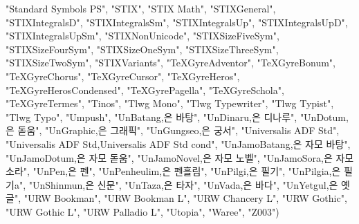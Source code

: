 \documentclass[
]{article}
\newenvironment{Shaded}{\begin{snugshade}}{\end{snugshade}}
\newcommand{\NormalTok}[1]{#1}
\newcommand{\StringTok}[1]{\textcolor[rgb]{0.31,0.60,0.02}{#1}}
\begin{document}
\begin{Shaded}
\begin{Highlighting}[]
  \StringTok{"Standard Symbols PS"}\NormalTok{,}
  \StringTok{"STIX"}\NormalTok{,}
  \StringTok{"STIX Math"}\NormalTok{,}
  \StringTok{"STIXGeneral"}\NormalTok{,}
  \StringTok{"STIXIntegralsD"}\NormalTok{,}
  \StringTok{"STIXIntegralsSm"}\NormalTok{,}
  \StringTok{"STIXIntegralsUp"}\NormalTok{,}
  \StringTok{"STIXIntegralsUpD"}\NormalTok{,}
  \StringTok{"STIXIntegralsUpSm"}\NormalTok{,}
  \StringTok{"STIXNonUnicode"}\NormalTok{,}
  \StringTok{"STIXSizeFiveSym"}\NormalTok{,}
  \StringTok{"STIXSizeFourSym"}\NormalTok{,}
  \StringTok{"STIXSizeOneSym"}\NormalTok{,}
  \StringTok{"STIXSizeThreeSym"}\NormalTok{,}
  \StringTok{"STIXSizeTwoSym"}\NormalTok{,}
  \StringTok{"STIXVariants"}\NormalTok{,}
  \StringTok{"TeXGyreAdventor"}\NormalTok{,}
  \StringTok{"TeXGyreBonum"}\NormalTok{,}
  \StringTok{"TeXGyreChorus"}\NormalTok{,}
  \StringTok{"TeXGyreCursor"}\NormalTok{,}
  \StringTok{"TeXGyreHeros"}\NormalTok{,}
  \StringTok{"TeXGyreHerosCondensed"}\NormalTok{,}
  \StringTok{"TeXGyrePagella"}\NormalTok{,}
  \StringTok{"TeXGyreSchola"}\NormalTok{,}
  \StringTok{"TeXGyreTermes"}\NormalTok{,}
  \StringTok{"Tinos"}\NormalTok{,}
  \StringTok{"Tlwg Mono"}\NormalTok{,}
  \StringTok{"Tlwg Typewriter"}\NormalTok{,}
  \StringTok{"Tlwg Typist"}\NormalTok{,}
  \StringTok{"Tlwg Typo"}\NormalTok{,}
  \StringTok{"Umpush"}\NormalTok{,}
  \StringTok{"UnBatang,은 바탕"}\NormalTok{,}
  \StringTok{"UnDinaru,은 디나루"}\NormalTok{,}
  \StringTok{"UnDotum,은 돋움"}\NormalTok{,}
  \StringTok{"UnGraphic,은 그래픽"}\NormalTok{,}
  \StringTok{"UnGungseo,은 궁서"}\NormalTok{,}
  \StringTok{"Universalis ADF Std"}\NormalTok{,}
  \StringTok{"Universalis ADF Std,Universalis ADF Std cond"}\NormalTok{,}
  \StringTok{"UnJamoBatang,은 자모 바탕"}\NormalTok{,}
  \StringTok{"UnJamoDotum,은 자모 돋움"}\NormalTok{,}
  \StringTok{"UnJamoNovel,은 자모 노벨"}\NormalTok{,}
  \StringTok{"UnJamoSora,은 자모 소라"}\NormalTok{,}
  \StringTok{"UnPen,은 펜"}\NormalTok{,}
  \StringTok{"UnPenheulim,은 펜흘림"}\NormalTok{,}
  \StringTok{"UnPilgi,은 필기"}\NormalTok{,}
  \StringTok{"UnPilgia,은 필기a"}\NormalTok{,}
  \StringTok{"UnShinmun,은 신문"}\NormalTok{,}
  \StringTok{"UnTaza,은 타자"}\NormalTok{,}
  \StringTok{"UnVada,은 바다"}\NormalTok{,}
  \StringTok{"UnYetgul,은 옛글"}\NormalTok{,}
  \StringTok{"URW Bookman"}\NormalTok{,}
  \StringTok{"URW Bookman L"}\NormalTok{,}
  \StringTok{"URW Chancery L"}\NormalTok{,}
  \StringTok{"URW Gothic"}\NormalTok{,}
  \StringTok{"URW Gothic L"}\NormalTok{,}
  \StringTok{"URW Palladio L"}\NormalTok{,}
  \StringTok{"Utopia"}\NormalTok{,}
  \StringTok{"Waree"}\NormalTok{,}
  \StringTok{"Z003"}\NormalTok{)}
 
\end{Highlighting}
\end{Shaded}
\end{document}
